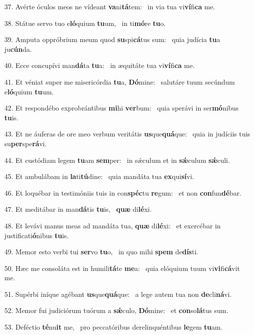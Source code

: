 37. Avérte óculos meos ne vídeant \textbf{va}ni\textbf{tá}tem: \ast\  in via tua vi\textbf{ví}fi\textbf{ca} me.\

38. Státue servo tuo e\textbf{ló}quium \textbf{tu}um, \ast\  in ti\textbf{mó}re \textbf{tu}o.\

39. Amputa oppróbrium meum quod \textbf{su}spi\textbf{cá}tus sum: \ast\  quia judícia \textbf{tu}a ju\textbf{cún}da.\

40. Ecce concupívi man\textbf{dá}ta \textbf{tu}a: \ast\  in æquitáte tua vi\textbf{ví}fi\textbf{ca} me.\

41. Et véniat super me misericórdia \textbf{tu}a, \textbf{Dó}mine: \ast\  salutáre tuum secúndum e\textbf{ló}quium \textbf{tu}um.\

42. Et respondébo exprobrántibus \textbf{mi}hi \textbf{ver}bum: \ast\  quia sperávi in ser\textbf{mó}nibus \textbf{tu}is.\

43. Et ne áuferas de ore meo verbum veritátis \textbf{us}que\textbf{quá}que: \ast\  quia in judíciis tuis su\textbf{per}spe\textbf{rá}vi.\

44. Et custódiam legem \textbf{tu}am \textbf{sem}per: \ast\  in sǽculum et in \textbf{sǽ}culum \textbf{sǽ}culi.\

45. Et ambulábam in \textbf{la}ti\textbf{tú}dine: \ast\  quia mandáta tua \textbf{ex}qui\textbf{sí}vi.\

46. Et loquébar in testimóniis tuis in con\textbf{spéc}tu \textbf{re}gum: \ast\  et non \textbf{con}fun\textbf{dé}bar.\

47. Et meditábar in man\textbf{dá}tis \textbf{tu}is, \ast\  \textbf{quæ} di\textbf{lé}xi.\

48. Et levávi manus meas ad mandáta tua, \textbf{quæ} di\textbf{lé}xi: \ast\  et exercébar in justificati\textbf{ó}nibus \textbf{tu}is.\

49. Memor esto verbi tui \textbf{ser}vo \textbf{tu}o, \ast\  in quo mihi \textbf{spem} de\textbf{dís}ti.\

50. Hæc me consoláta est in humili\textbf{tá}te \textbf{me}a: \ast\  quia elóquium tuum vi\textbf{vi}fi\textbf{cá}vit me.\

51. Supérbi iníque agébant \textbf{us}que\textbf{quá}que: \ast\  a lege autem tua non \textbf{de}cli\textbf{ná}vi.\

52. Memor fui judiciórum tuórum a \textbf{sǽ}culo, \textbf{Dó}mine: \ast\  et \textbf{con}so\textbf{lá}tus sum.\

53. Deféctio \textbf{té}nu\textbf{it} me, \ast\  pro peccatóribus derelinquéntibus \textbf{le}gem \textbf{tu}am.\

